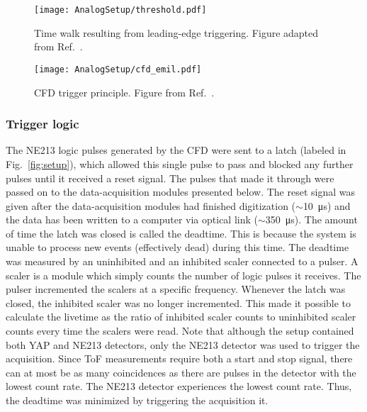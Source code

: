 \documentclass[main.tex]{subfiles}
\begin{document}
\begin{figure}[h]
    \centering
        \texttt{[image: AnalogSetup/threshold.pdf]}
        \caption[Time walk resulting from leading edge triggering]{Time walk resulting from leading-edge triggering. Figure adapted from Ref.~\cite{rofors}.}
    \label{fig:discriminator}
\end{figure}

\begin{figure}[h]
    \centering
        \texttt{[image: AnalogSetup/cfd\_emil.pdf]}
        \caption[CFD trigger principle.]{CFD trigger principle. Figure from Ref.~\cite{rofors}.}
    \label{fig:cfd}
\end{figure}



\subsubsection{Trigger logic}
The NE213 logic pulses generated by the CFD were sent to a latch (labeled  in Fig.~\ref{fig:setup}), which allowed this single pulse to pass and blocked any further pulses until it received a reset signal. The pulses that made it through were passed on to the data-acquisition modules presented below. The reset signal was given after the data-acquisition modules had finished digitization ($\sim$\SI{10}{\micro s}) and the data has been written to a computer via optical link ($\sim$\SI{350}{\micro s}). The amount of time the latch was closed is called the deadtime. This is because the system is unable to process new events (effectively dead) during this time. The deadtime was measured by an uninhibited and an inhibited scaler connected to a pulser. A scaler is a module which simply counts the number of logic pulses it receives. The pulser incremented the scalers at a specific frequency. Whenever the latch was closed, the inhibited scaler was no longer incremented. This made it possible to calculate the livetime as the ratio of inhibited scaler counts to uninhibited scaler counts every time the scalers were read. Note that although the setup contained both YAP and NE213 detectors, only the NE213 detector was used to trigger the acquisition. Since ToF measurements require both a start and stop signal, there can at most be as many coincidences as there are pulses in the detector with the lowest count rate. The NE213 detector experiences the lowest count rate. Thus, the deadtime was minimized by triggering the acquisition it.
\end{document}
